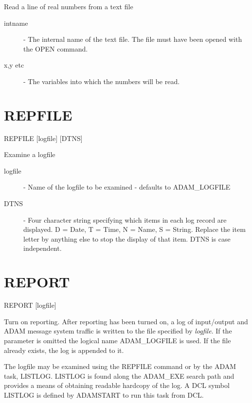 \documentclass[twoside,11pt]{report}
\newcommand{\xlabel}[1]{}
\begin{document}
 Read a line of real numbers from a text file

\begin{description}

\item[intname]  -  The internal name of the text file. The file must have
                   been opened with the OPEN command.

\item[x,y etc] -  The variables into which the numbers will be read.

\end{description}

                                 
\section{\xlabel{REPFILE}REPFILE\label{REPFILE}}

    REPFILE \hspace{.5cm} [logfile] \hspace{.5cm} [DTNS]

Examine a logfile

\begin{description}

\item[logfile] -  Name of the logfile to be examined - defaults to
ADAM\_LOGFILE

\item[DTNS]  -  Four character string specifying which items in each log 
record are displayed.
D = Date, T = Time, N = Name, S = String.
Replace the item letter by anything else to stop the display of that item.
DTNS is case independent.

\end{description}
        
\section{\xlabel{REPORT}REPORT\label{REPORT}}

    REPORT \hspace{.5cm} [logfile]

Turn on reporting. After reporting has been turned on, a log of input/output and
ADAM message system traffic is written to the file specified by {\it logfile}.
If the parameter is omitted the logical name ADAM\_LOGFILE is used. 
If the file already exists, the log is appended to it.

The logfile may be examined using the REPFILE command or by the ADAM task,
LISTLOG. LISTLOG is found along the ADAM\_EXE search path and provides a means
of obtaining readable hardcopy of the log. A DCL symbol LISTLOG is defined
by ADAMSTART to run this task from DCL.
\end{document}
